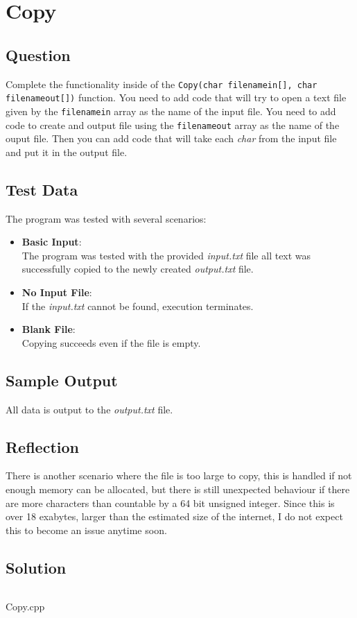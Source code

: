 \section{Copy}
    \subsection*{Question}
        Complete the functionality inside of the \texttt{Copy(char filenamein[], char filenameout[])} function. 
        You need to add code that will try to open a text file given by the \texttt{filenamein} array as the name of the input file. 
        You need to add code to create and output file using the \texttt{filenameout} array as the name of the ouput file. 
        Then you can add code that will take each \textit{char} from the input file and put it in the output file.
            
    \subsection*{Test Data}
        The program was tested with several scenarios:
        \begin{itemize}
            \item \textbf{Basic Input}:\\
                The program was tested with the provided \textit{input.txt} file
                all text was successfully copied to the newly created \textit{output.txt} file.
            
            \item \textbf{No Input File}:\\
                If the \textit{input.txt} cannot be found, execution terminates.
                
            \item \textbf{Blank File}:\\
                Copying succeeds even if the file is empty.
        \end{itemize}
        
    \subsection*{Sample Output}
        All data is output to the \textit{output.txt} file.

    \subsection*{Reflection}
        There is another scenario where the file is too large to copy, this is handled
        if not enough memory can be allocated, but there is still unexpected behaviour if there are
        more characters than countable by a 64 bit unsigned integer. Since this is over
        18 exabytes, larger than the estimated size of the internet, 
        I do not expect this to become an issue anytime soon.

    \subsection*{Solution}
        \begin{listing}[H]
            \inputminted[firstline=5, lastline=45]{cpp}{../Tasks/02-Copy/Copy.cpp}%
            \caption{Copy.cpp}
        \end{listing}